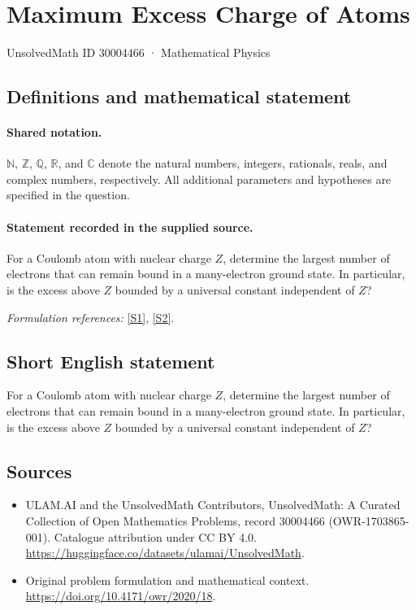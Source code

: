 \documentclass[11pt]{article}
\newcommand{\sref}[2]{\hyperlink{source:#1:#2}{[S#2]}}
\begin{document}
\setcounter{section}{30004465}
\section{Maximum Excess Charge of Atoms}\label{30004466}
{\small UnsolvedMath ID 30004466 · Mathematical Physics}
\subsection{Definitions and mathematical statement}

\paragraph{Shared notation.}$\mathbb N$, $\mathbb Z$, $\mathbb Q$, $\mathbb R$, and $\mathbb C$ denote the natural numbers, integers, rationals, reals, and complex numbers, respectively. All additional parameters and hypotheses are specified in the question.


\paragraph{Statement recorded in the supplied source.}
For a Coulomb atom with nuclear charge $Z$, determine the largest number of electrons that can remain bound in a many-electron ground state. In particular, is the excess above $Z$ bounded by a universal constant independent of $Z$?
\par\smallskip\textit{Formulation references:} \sref{30004466}{1}, \sref{30004466}{2}.
\subsection{Short English statement}
For a Coulomb atom with nuclear charge $Z$, determine the largest number of electrons that can remain bound in a many-electron ground state. In particular, is the excess above $Z$ bounded by a universal constant independent of $Z$?
\subsection{Sources}
\begin{itemize}
\item[\hypertarget{source:30004466:1}{S1}] ULAM.AI and the UnsolvedMath Contributors, UnsolvedMath: A Curated Collection of Open Mathematics Problems, record 30004466 (OWR-1703865-001). Catalogue attribution under CC BY 4.0.
\url{https://huggingface.co/datasets/ulamai/UnsolvedMath}.
\item[\hypertarget{source:30004466:2}{S2}] Original problem formulation and mathematical context.
\url{https://doi.org/10.4171/owr/2020/18}.
\end{itemize}
\label{end:30004466}
\end{document}
